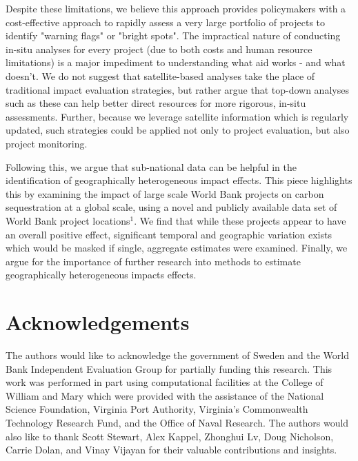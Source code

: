 \documentclass{article}\usepackage[]{graphicx}\usepackage[]{color}
\newenvironment{knitrout}{}{}  %
\begin{document}
\begin{knitrout}
\par
Despite these limitations, we believe this approach provides policymakers with a cost-effective approach to rapidly assess a very large portfolio of projects to identify "warning flags" or "bright spots".  
The impractical nature of conducting in-situ analyses for every project (due to both costs and human resource limitations) is a major impediment to understanding what aid works - and what doesn't.
We do not suggest that satellite-based analyses take the place of traditional impact evaluation strategies, but rather argue that top-down analyses such as these can help better direct resources for more rigorous, in-situ assessments.
Further, because we leverage satellite information which is regularly updated, such strategies could be applied not only to project evaluation, but also project monitoring.
\par
Following this, we argue that sub-national data can be helpful in the identification of geographically heterogeneous impact effects. 
This piece highlights this by examining the impact of large scale World Bank projects on carbon sequestration at a global scale, using a novel and publicly available data set of World Bank project locations\begin{math}^{1}\end{math}.  
We find that while these projects appear to have an overall positive effect, significant temporal and geographic variation exists which would be masked if single, aggregate estimates were examined.
Finally, we argue for the importance of further research into methods to estimate geographically heterogeneous impacts effects.
\newpage

\section{Acknowledgements}
The authors would like to acknowledge the government of Sweden and the World Bank Independent Evaluation Group for partially funding this research.  
This work was performed in part using computational facilities at the College of William and Mary which were provided with the assistance of the National Science Foundation, Virginia Port Authority, Virginia's Commonwealth Technology Research Fund, and the Office of Naval Research.  
The authors would also like to thank Scott Stewart, Alex Kappel, Zhonghui Lv, Doug Nicholson, Carrie Dolan, and Vinay Vijayan for their valuable contributions and insights.

\newpage
\printbibliography


\end{knitrout}
\end{document}
